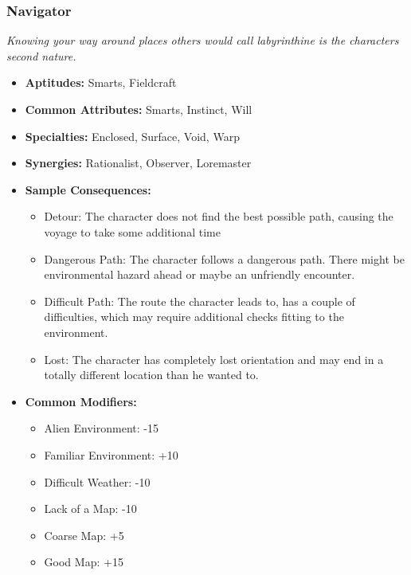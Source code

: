 \subsubsection{Navigator}\label{Navigator}
\textit{Knowing your way around places others would call labyrinthine is the characters second nature.}
\begin{itemize}
	\item \textbf{Aptitudes:} Smarts, Fieldcraft
	\item \textbf{Common Attributes:} Smarts, Instinct, Will
	\item \textbf{Specialties:} Enclosed, Surface, Void, Warp
	\item \textbf{Synergies:} Rationalist, Observer, Loremaster
	\item \textbf{Sample Consequences:} 
	\begin{itemize}
		\item Detour: The character does not find the best possible path, causing the voyage to take some additional time
		\item Dangerous Path: The character follows a dangerous path. There might be environmental hazard ahead or maybe an unfriendly encounter.
		\item Difficult Path: The route the character leads to, has a couple of difficulties, which may require additional checks fitting to the environment.
		\item Lost: The character has completely lost orientation and may end in a totally different location than he wanted to. 
	\end{itemize}
	\item \textbf{Common Modifiers:}
	\begin{itemize}
 		\item Alien Environment: -15
 		\item Familiar Environment: +10
 		\item Difficult Weather: -10
 		\item Lack of a Map: -10
 		\item Coarse Map: +5
 		\item Good Map: +15
	\end{itemize}
\end{itemize}

